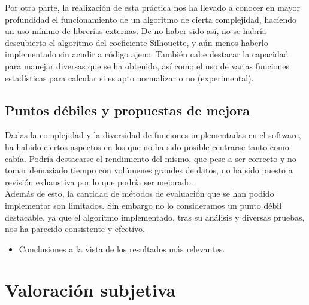 \documentclass[10pt,a4paper]{article}
\begin{document}
Por otra parte, la realización de esta práctica nos ha llevado a conocer en
mayor profundidad el funcionamiento de un algoritmo de cierta complejidad,
haciendo un uso mínimo de librerías externas. De no haber sido así, no se habría
descubierto el algoritmo del coeficiente Silhouette, y aún menos haberlo
implementado sin acudir a código ajeno. También cabe destacar la capacidad para
manejar diversas que se ha obtenido, así como el uso de varias funciones
estadísticas para calcular si es apto normalizar o no (experimental).

\subsection{Puntos débiles y propuestas de mejora}

Dadas la complejidad y la diversidad de funciones implementadas en el software,
ha habido ciertos aspectos en los que no ha sido posible centrarse tanto como
cabía. Podría destacarse el rendimiento del mismo, que pese a ser correcto y no
tomar demasiado tiempo con volúmenes grandes de datos, no ha sido puesto a
revisión exhaustiva por lo que podría ser mejorado.\\

Además de esto, la cantidad de métodos de evaluación que se han podido
implementar son limitados. Sin embargo no lo consideramos un punto débil
destacable, ya que el algoritmo implementado, tras su análisis y diversas
pruebas, nos ha parecido consistente y efectivo.\\

	\begin{itemize}
	
		\item Conclusiones a la vista de los resultados más relevantes.
		
	\end{itemize}

\section{Valoración subjetiva}
\end{document}
